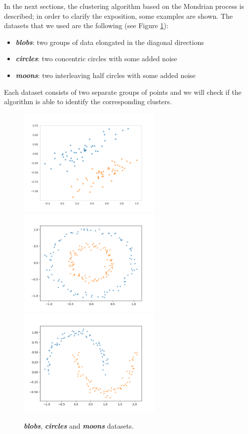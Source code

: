 \documentclass[a4paper]{article}
\begin{document}
In the next sections, the clustering algorithm based on the Mondrian process is described;
in order to clarify the exposition, some examples are shown.
The datasets that we used are the following (see Figure \ref{datasets}):
\begin{itemize}[nolistsep]
\item \emph{\textbf{blobs}}: two groups of data elongated in the diagonal directions
\item \emph{\textbf{circles}}: two concentric circles with some added noise%
\item \emph{\textbf{moons}}: two interleaving half circles with some added noise
\end{itemize}
Each dataset consists of two separate groups of points and we will check if the algorithm is able to identify the corresponding clusters.
\begin{figure}[H]
        \centering
        \includegraphics[width=7cm]{grafici/2blobs.png}
 \includegraphics[width=7cm]{grafici/makecircles.png}
 \includegraphics[width=7cm]{grafici/makemoons.png}        
\caption{\emph{\textbf{blobs}}, \emph{\textbf{circles}} and \emph{\textbf{moons}} datasets.}
        \label{datasets}
    \end{figure}   
\end{document}
